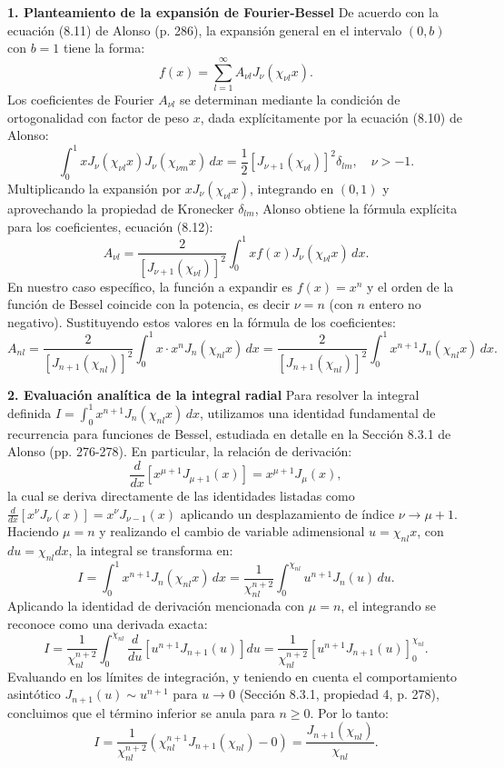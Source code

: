 \documentclass[a4paper]{article}
\begin{document}
\textbf{1. Planteamiento de la expansión de Fourier-Bessel}
De acuerdo con la ecuación (8.11) de Alonso (p. 286), la expansión general en el intervalo $(0, b)$ con $b=1$ tiene la forma:
$$f(x) = \sum_{l=1}^{\infty} A_{\nu l} J_\nu(\chi_{\nu l} x).$$
Los coeficientes de Fourier $A_{\nu l}$ se determinan mediante la condición de ortogonalidad con factor de peso $x$, dada explícitamente por la ecuación (8.10) de Alonso:
$$\int_0^1 x J_\nu(\chi_{\nu l} x) J_\nu(\chi_{\nu m} x) \, dx = \frac{1}{2} [J_{\nu+1}(\chi_{\nu l})]^2 \delta_{lm}, \quad \nu > -1.$$
Multiplicando la expansión por $x J_\nu(\chi_{\nu l} x)$, integrando en $(0,1)$ y aprovechando la propiedad de Kronecker $\delta_{lm}$, Alonso obtiene la fórmula explícita para los coeficientes, ecuación (8.12):
$$A_{\nu l} = \frac{2}{[J_{\nu+1}(\chi_{\nu l})]^2} \int_0^1 x f(x) J_\nu(\chi_{\nu l} x) \, dx.$$
En nuestro caso específico, la función a expandir es $f(x) = x^n$ y el orden de la función de Bessel coincide con la potencia, es decir $\nu = n$ (con $n$ entero no negativo). Sustituyendo estos valores en la fórmula de los coeficientes:
$$A_{n l} = \frac{2}{[J_{n+1}(\chi_{n l})]^2} \int_0^1 x \cdot x^n J_n(\chi_{n l} x) \, dx = \frac{2}{[J_{n+1}(\chi_{n l})]^2} \int_0^1 x^{n+1} J_n(\chi_{n l} x) \, dx.$$

\textbf{2. Evaluación analítica de la integral radial}
Para resolver la integral definida $I = \int_0^1 x^{n+1} J_n(\chi_{n l} x) \, dx$, utilizamos una identidad fundamental de recurrencia para funciones de Bessel, estudiada en detalle en la Sección 8.3.1 de Alonso (pp. 276-278). En particular, la relación de derivación:
$$\frac{d}{dx} \left[ x^{\mu+1} J_{\mu+1}(x) \right] = x^{\mu+1} J_\mu(x),$$
la cual se deriva directamente de las identidades listadas como $\frac{d}{dx}[x^\nu J_\nu(x)] = x^\nu J_{\nu-1}(x)$ aplicando un desplazamiento de índice $\nu \to \mu+1$. Haciendo $\mu = n$ y realizando el cambio de variable adimensional $u = \chi_{n l} x$, con $du = \chi_{n l} dx$, la integral se transforma en:
$$I = \int_0^1 x^{n+1} J_n(\chi_{n l} x) \, dx = \frac{1}{\chi_{n l}^{n+2}} \int_0^{\chi_{n l}} u^{n+1} J_n(u) \, du.$$
Aplicando la identidad de derivación mencionada con $\mu=n$, el integrando se reconoce como una derivada exacta:
$$I = \frac{1}{\chi_{n l}^{n+2}} \int_0^{\chi_{n l}} \frac{d}{du} \left[ u^{n+1} J_{n+1}(u) \right] du = \frac{1}{\chi_{n l}^{n+2}} \left[ u^{n+1} J_{n+1}(u) \right]_0^{\chi_{n l}}.$$
Evaluando en los límites de integración, y teniendo en cuenta el comportamiento asintótico $J_{n+1}(u) \sim u^{n+1}$ para $u \to 0$ (Sección 8.3.1, propiedad 4, p. 278), concluimos que el término inferior se anula para $n \ge 0$. Por lo tanto:
$$I = \frac{1}{\chi_{n l}^{n+2}} \left( \chi_{n l}^{n+1} J_{n+1}(\chi_{n l}) - 0 \right) = \frac{J_{n+1}(\chi_{n l})}{\chi_{n l}}.$$
\end{document}
